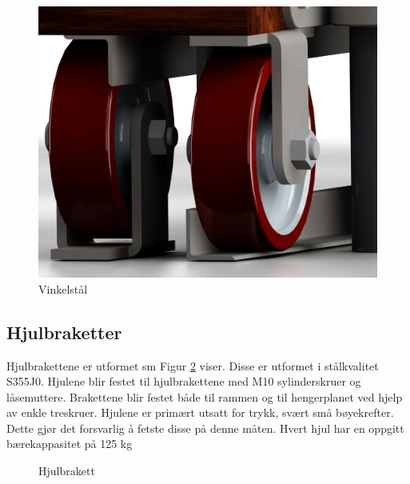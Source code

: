 \begin{figure}[h!]
\centerline{\includegraphics [width=15cm]{images/9.png}}
\caption{Vinkelstål}
\label{F2}
\end{figure}

\subsection{Hjulbraketter}

Hjulbrakettene er utformet sm Figur \ref{F3} viser. Disse er utformet i stålkvalitet S355J0. 
Hjulene blir festet til hjulbrakettene med M10 sylinderskruer og låsemuttere. Brakettene blir festet både til rammen og til hengerplanet ved hjelp av enkle treskruer. Hjulene er primært utsatt for trykk, svært små bøyekrefter. Dette gjør det forsvarlig å fetste disse på denne måten. Hvert hjul har en oppgitt bærekappasitet på 125 kg 

\begin{figure}[h!]
\centering   
{}
\caption{Hjulbrakett}
\label{F3}
\end{figure}

